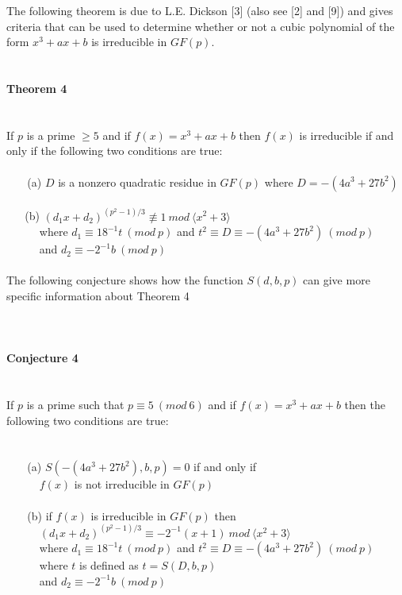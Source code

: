 \documentclass[final,letterpaper,oneside,10pt]{article}
\begin{document}
The following theorem is due to L.E. Dickson [3] (also see [2] and [9]) and gives criteria that can be used to determine whether or not a cubic
polynomial of the form $x^3+ax+b$ is irreducible in $GF(p)$.
\\
\\
\\
\textbf{Theorem 4}
\\
\\
\\
If $p$ is a prime $\ge 5$ and if $f(x) = x^3+ax+b$ then $f(x)$ is irreducible if and only if the following two conditions are true:
\\
\\
$~~~~~~~$ (a) $D$ is a nonzero quadratic residue in $GF(p)$ where $D = -(4a^3+27b^2)$
\\
\\
$~~~~~~$ (b) $(d_1x+d_2)^{(p^{2}-1)/3} \not\equiv 1~mod~\langle x^2 + 3 \rangle$
\\
$~~~~~~~~~~~~$ where $d_1 \equiv 18^{-1}t~(mod~p)$ and $t^2 \equiv D \equiv -(4a^3 + 27b^2)~(mod~p)$
\\
$~~~~~~~~~~~~$ and $d_2 \equiv -2^{-1}b~(mod~p)$
\\
\\
The following conjecture shows how the function $S(d,b,p)$ can give more specific information about Theorem 4
\\
\\
\\
\\
\textbf{Conjecture 4}
\\
\\
\\
If $p$ is a prime such that $p \equiv 5~(mod~6)$ and if $f(x) = x^3+ax+b$ then the following two conditions are true:
\\
\\
\\
$~~~~~~~$ (a) $S(-(4a^3 + 27b^2),b,p)=0$ if and only if 
\\
$~~~~~~~~~~~~$ $f(x)$ is not irreducible in $GF(p)$
\\
\\
$~~~~~~~$ (b) if $f(x)$ is irreducible in $GF(p)$ then
\\
$~~~~~~~~~~~~$ $(d_1x+d_2)^{(p^{2}-1)/3} \equiv -2^{-1}(x+1)~mod~\langle x^2 + 3 \rangle$
\\
$~~~~~~~~~~~~$ where $d_1 \equiv 18^{-1}t~(mod~p)$ and $t^2 \equiv D \equiv -(4a^3 + 27b^2)~(mod~p)$
\\
$~~~~~~~~~~~~$ where $t$ is defined as $t=S(D,b,p)$
\\
$~~~~~~~~~~~~$ and $d_2 \equiv -2^{-1}b~(mod~p)$
\\
\end{document}
